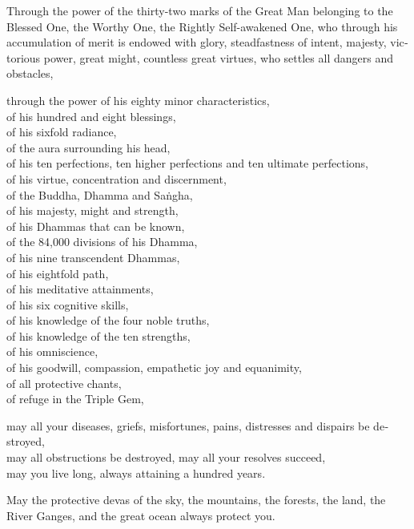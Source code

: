 \begin{english}
  \setlength{\parskip}{8pt}%
  Through the power of the thirty-two marks of the Great Man belonging to the
  Blessed One, the Worthy One, the Rightly Self-awakened One, who through his
  accumulation of merit is endowed with glory, steadfastness of intent, majesty,
  victorious power, great might, countless great virtues, who settles all
  dangers and obstacles,

  \clearpage

  through the power of his eighty minor characteristics,\\
  of his hundred and eight blessings,\\
  of his sixfold radiance,\\
  of the aura surrounding his head,\\
  of his ten perfections, ten higher perfections and ten ultimate perfections,\\
  of his virtue, concentration and discernment,\\
  of the Buddha, Dhamma and Saṅgha,\\
  of his majesty, might and strength,\\
  of his Dhammas that can be known,\\
  of the 84,000 divisions of his Dhamma,\\
  of his nine transcendent Dhammas,\\
  of his eightfold path,\\
  of his meditative attainments,\\
  of his six cognitive skills,\\
  of his knowledge of the four noble truths,\\
  of his knowledge of the ten strengths,\\
  of his omniscience,\\
  of his goodwill, compassion, empathetic joy and equanimity,\\
  of all protective chants,\\
  of refuge in the Triple Gem,

  may all your diseases, griefs, misfortunes, pains, distresses and dispairs be destroyed,\\
  may all obstructions be destroyed, may all your resolves succeed,\\
  may you live long, always attaining a hundred years.

  May the protective devas of the sky, the mountains, the forests, the land, the
  River Ganges, and the great ocean always protect you.
\end{english}

